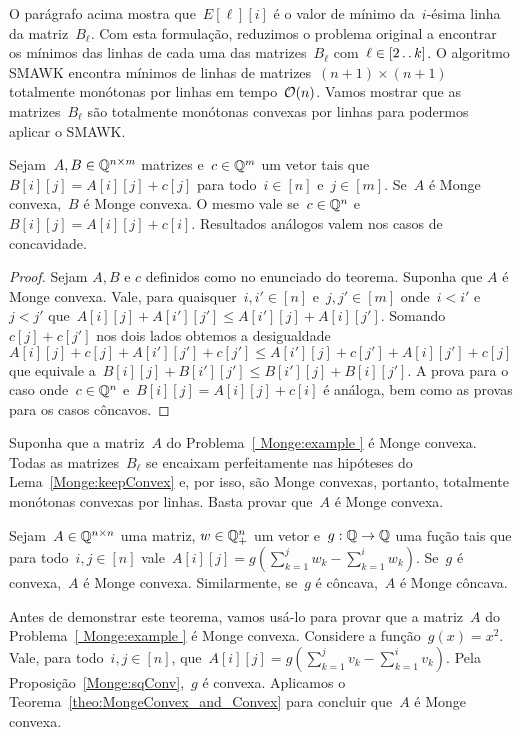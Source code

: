 O parágrafo acima mostra que~$E[\ell][i]$ é o valor de mínimo da~$i$-ésima linha da matriz~$B_\ell$. Com esta formulação, reduzimos o problema original a encontrar os mínimos das linhas de cada uma das matrizes~$B_\ell$ com~$\ell \in [2 \,.\,.\, k]$. O algoritmo SMAWK encontra mínimos de linhas de matrizes~${ (n+1) \times (n+1) }$ totalmente monótonas por linhas em tempo~$\mathcal{O}(n)$. Vamos mostrar que as matrizes~$B_\ell$ são totalmente monótonas convexas por linhas para podermos aplicar o SMAWK.

\begin{lema} \label{Monge:keepConvex}
Sejam~${ A,B \in \mathbb{Q}^{n \times m} }$ matrizes e~${ c \in \mathbb{Q}^m }$ um vetor tais que~${ B[i][j] = A[i][j] + c[j] }$ para todo~${ i \in [n] }$ e~${ j \in [m] }$. Se~$A$ é Monge convexa,~$B$ é Monge convexa. O mesmo vale se~$c \in \mathbb{Q}^n$ e~${B[i][j] = A[i][j] + c[i]}$. Resultados análogos valem nos casos de concavidade.
\end{lema}

\begin{proof}
Sejam $A,B$ e $c$ definidos como no enunciado do teorema. Suponha que $A$ é Monge convexa. Vale, para quaisquer~${ i,i' \in [n]}$ e~${ j,j' \in [m] }$ onde~${ i < i' }$ e~${ j < j' }$ que~${A[i][j] + A[i'][j'] \leq A[i'][j] + A[i][j']}$. Somando~${ c[j] + c[j'] }$ nos dois lados obtemos a desigualdade~${A[i][j] + c[j] + A[i'][j'] + c[j'] \leq A[i'][j] + c[j'] + A[i][j'] + c[j]}$ que equivale a~${B[i][j] + B[i'][j'] \leq B[i'][j] + B[i][j']}$. A prova para o caso onde~$c \in \mathbb{Q}^n$ e~${B[i][j] = A[i][j] + c[i]}$ é análoga, bem como as provas para os casos côncavos.
\end{proof}

Suponha que a matriz~$A$ do Problema~\ref{ Monge:example } é Monge convexa. Todas as matrizes~$B_\ell$ se encaixam perfeitamente nas hipóteses do Lema~\ref{Monge:keepConvex} e, por isso, são Monge convexas, portanto, totalmente monótonas convexas por linhas. Basta provar que~$A$ é Monge convexa.

\begin{theo} \label{theo:MongeConvex_and_Convex}
Sejam~$A \in \mathbb{Q}^{n \times n}$ uma matriz, $w \in \mathbb{Q}_+^n$ um vetor e~${g : \mathbb{Q} \to \mathbb{Q}}$ uma fução tais que para todo~$i,j \in [n]$ vale~${A[i][j] = g\left(\sum\limits_{k=1}^j w_k - \sum\limits_{k=1}^i w_k\right)}$. Se~$g$ é convexa,~$A$ é Monge convexa. Similarmente, se~$g$ é côncava,~$A$ é Monge côncava.
\end{theo}

Antes de demonstrar este teorema, vamos usá-lo para provar que a matriz~$A$ do Problema~\ref{ Monge:example } é Monge convexa. Considere a função~$g(x) = x^2$. Vale, para todo~${ i,j \in [n] }$, que~${A[i][j] = g\left(\sum\limits_{k=1}^j v_k - \sum\limits_{k=1}^i v_k \right)}$. Pela Proposição~\ref{Monge:sqConv},~$g$ é convexa. Aplicamos o Teorema~\ref{theo:MongeConvex_and_Convex} para concluir que~$A$ é Monge convexa.

